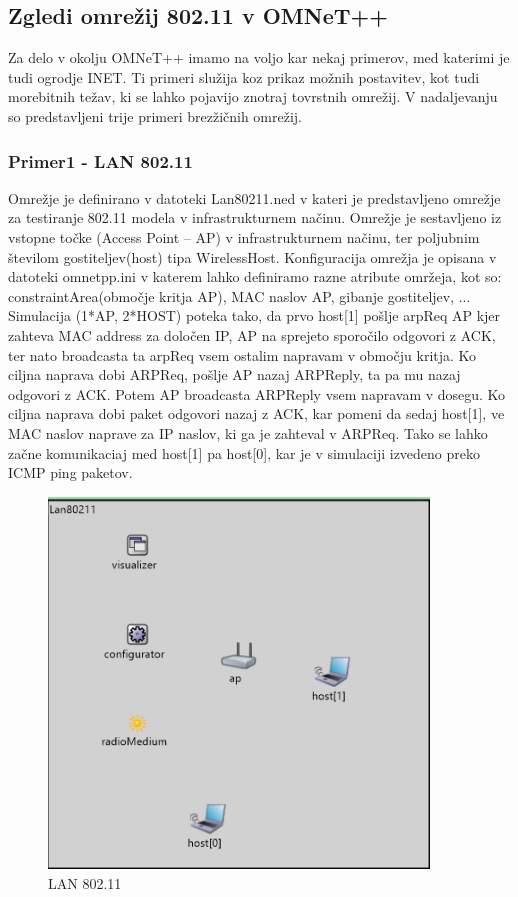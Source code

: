 \documentclass[11pt,a4paper,slovene]{myarticle}
\begin{document}
\subsection{Zgledi omrežij 802.11 v OMNeT++}
Za delo v okolju OMNeT++ imamo na voljo kar nekaj primerov, med katerimi je tudi ogrodje INET. Ti primeri služija koz prikaz možnih postavitev, kot tudi morebitnih težav, ki se lahko pojavijo znotraj tovrstnih omrežij. V nadaljevanju so predstavljeni trije primeri brezžičnih omrežij.
\subsubsection{Primer1 - LAN 802.11}
Omrežje je definirano v datoteki Lan80211.ned v kateri je predstavljeno omrežje za testiranje 802.11 modela v infrastrukturnem načinu. Omrežje je sestavljeno iz vstopne točke (Access Point – AP) v infrastrukturnem načinu, ter poljubnim številom gostiteljev(host) tipa 	WirelessHost. Konfiguracija omrežja je opisana v datoteki omnetpp.ini v katerem lahko definiramo razne atribute omržeja, kot so: constraintArea(območje kritja AP), MAC naslov AP, gibanje gostiteljev, ... Simulacija (1*AP, 2*HOST) poteka tako, da prvo host[1] pošlje arpReq AP kjer zahteva MAC address za določen IP, AP na sprejeto sporočilo odgovori z ACK, ter nato broadcasta ta arpReq vsem ostalim napravam v območju kritja. Ko ciljna naprava dobi ARPReq, pošlje AP nazaj ARPReply, ta pa mu nazaj odgovori z ACK. Potem AP broadcasta 	ARPReply vsem napravam v dosegu. Ko ciljna naprava dobi paket odgovori nazaj z ACK, kar pomeni da sedaj host[1], ve MAC naslov naprave za IP naslov, ki ga je zahteval v ARPReq. Tako se lahko začne komunikaciaj med host[1] pa host[0], kar je v simulaciji izvedeno preko ICMP ping paketov.
\begin{figure}[h]
	\centering
		\includegraphics[width=0.9\textwidth, keepaspectratio=true]{./images/lan80211.png}
	\caption{LAN 802.11}
	\label{fig:lan80211}
\end{figure}
\end{document}
